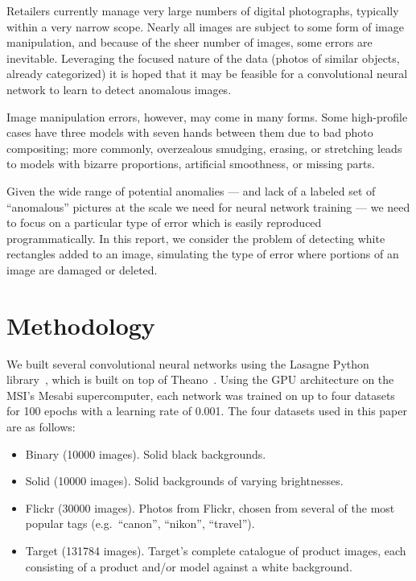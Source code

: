 \documentclass{article}
\newcommand{\dataset}[1]{\textsf{#1}}
\begin{document}
  Retailers currently manage very large numbers of digital photographs, typically within a very narrow scope. Nearly all images are subject to some form of image manipulation, and because of the sheer number of images, some errors are inevitable. Leveraging the focused nature of the data (photos of similar objects, already categorized) it is hoped that it may be feasible for a convolutional neural network to learn to detect anomalous images.

  Image manipulation errors, however, may come in many forms. Some high-profile cases have three models with seven hands between them due to bad photo compositing; more commonly, overzealous smudging, erasing, or stretching leads to models with bizarre proportions, artificial smoothness, or missing parts.

  Given the wide range of potential anomalies --- and lack of a labeled set of ``anomalous'' pictures at the scale we need for neural network training --- we need to focus on a particular type of error which is easily reproduced programmatically. In this report, we consider the problem of detecting white rectangles added to an image, simulating the type of error where portions of an image are damaged or deleted.


\section{Methodology}

  We built several convolutional neural networks using the Lasagne Python library~\cite{lasagne}, which is built on top of Theano~\cite{theano1,theano2}. Using the GPU architecture on the MSI's Mesabi supercomputer, each network was trained on up to four datasets for 100 epochs with a learning rate of 0.001. The four datasets used in this paper are as follows:

  \begin{itemize}
    \item \dataset{Binary} (10000 images). Solid black backgrounds.
    \item \dataset{Solid} (10000 images). Solid backgrounds of varying brightnesses.
    \item \dataset{Flickr} (30000 images). Photos from Flickr, chosen from several of the most popular tags (e.g.\ ``canon'', ``nikon'', ``travel'').
    \item \dataset{Target} (131784 images). Target's complete catalogue of product images, each consisting of a product and/or model against a white background.
  \end{itemize}
\end{document}
